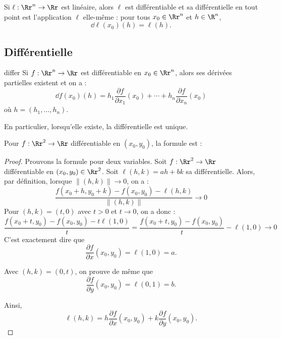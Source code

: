 \begin{exemple}{}{}
	Si $\ell : \Rr^n \to \Rr$ est linéaire, alors $\ell$ est différentiable et sa différentielle en tout point est l'application $\ell$ elle-même : pour tous $x_0 \in \Rr^n$ et $h \in \R^n$,
	$$
	\dd \ell (x_0) (h) = \ell(h).
	$$ 
\end{exemple}




\subsection{Différentielle}


\begin{proposition}{}{differ}
	Si $f : \Rr^n \to \Rr$ est différentiable en $x_0 \in \Rr^n$, alors ses dérivées partielles existent et on a :
	$$
	\dd f(x_0)(h) = 
	h_1 \frac{\partial f}{\partial x_1}(x_0)  + \cdots + h_n \frac{\partial f}{\partial x_n}(x_0)  
	$$
	où $h = (h_1,\ldots,h_n)$.
\end{proposition}
En particulier, lorsqu'elle existe, la différentielle est unique.

\bigskip

Pour $f : \Rr^2 \to \Rr$ différentiable en $(x_0,y_0)$, la formule est :

\begin{proof}
	Prouvons la formule pour deux variables.
	Soit $f : \Rr^2 \to \Rr$ différentiable en $(x_0,y_0) \in \Rr^2$.
	Soit $\ell(h,k) = ah + bk$ sa différentielle. Alors, par définition, lorsque $\|(h,k)\| \to 0$, on a :
	$$\frac{f(x_0+ h,y_0+k) - f(x_0,y_0) - \ell(h,k)}{\|(h,k)\|} \longrightarrow 0$$
	Pour $(h,k) = (t,0)$ avec $t>0$ et $t \to 0$, on a donc :
	$$\frac{f(x_0+ t,y_0) - f(x_0,y_0) - t\ell(1,0)}{t}
	= \frac{f(x_0+ t,y_0) - f(x_0,y_0)}{t} - \ell(1,0) \longrightarrow  0$$
	C'est exactement dire que 
	$$\frac{\partial f}{\partial x}(x_0,y_0) = \ell(1,0) = a.$$
	
	Avec $(h,k) = (0,t)$, on prouve de même que 
	$$\frac{\partial f}{\partial y}(x_0,y_0) = \ell(0,1) = b.$$
	
	Ainsi,
	$$\ell(h,k) = h \frac{\partial f}{\partial x}(x_0,y_0) +
	k \frac{\partial f}{\partial y}(x_0,y_0).$$
\end{proof}





